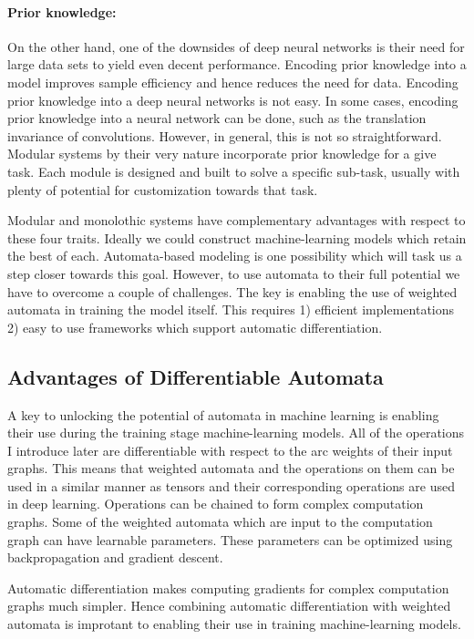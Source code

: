 \documentclass[main.tex]{subfiles}
\begin{document}
\paragraph{Prior knowledge:} On the other hand, one of the downsides of deep
neural networks is their need for large data sets to yield even decent
performance. Encoding prior knowledge into a model improves sample efficiency
and hence reduces the need for data. Encoding prior knowledge into a deep
neural networks is not easy. In some cases, encoding prior knowledge into a
neural network can be done, such as the translation invariance of convolutions.
However, in general, this is not so straightforward. Modular systems by their
very nature incorporate prior knowledge for a give task. Each module is
designed and built to solve a specific sub-task, usually with plenty of
potential for customization towards that task.

Modular and monolothic systems have complementary advantages with respect to
these four traits. Ideally we could construct machine-learning models which
retain the best of each. Automata-based modeling is one possibility which will
task us a step closer towards this goal.  However, to use automata to their
full potential we have to overcome a couple of challenges. The key is enabling
the use of weighted automata in training the model itself. This requires 1)
efficient implementations 2) easy to use frameworks which support automatic
differentiation.

\subsection{Advantages of Differentiable Automata}

A key to unlocking the potential of automata in machine learning is enabling
their use during the training stage machine-learning models. All of the
operations I introduce later are differentiable with respect to the arc weights
of their input graphs. This means that weighted automata and the operations on
them can be used in a similar manner as tensors and their corresponding
operations are used in deep learning. Operations can be chained to form complex
computation graphs. Some of the weighted automata which are input to the
computation graph can have learnable parameters. These parameters can be
optimized using backpropagation and gradient descent.

Automatic differentiation makes computing gradients for complex computation
graphs much simpler. Hence combining automatic differentiation with weighted
automata is improtant to enabling their use in training machine-learning
models.
\end{document}
